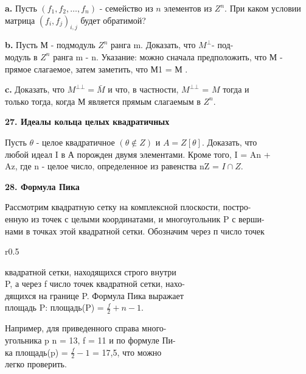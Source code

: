 {\bf a.} Пусть $( f_1,f_2,\ldots,f_n )$ - семейство из $n$ элементов из $Z^n$. При 
каком условии матрица $(f_i,f_j)_{i,j}$ будет обратимой? 

\medskip

{\bf b.} Пусть М - подмодуль $Z^n$ ранга m. Доказать, что $M^{\bot}$- 
под-\\модуль в $Z^n$ ранга m - n. Указание: можно сначала предположить, что 
М - прямое слагаемое, затем заметить, что М1 = М . 

\medskip

{\bf c.} Доказать, что  $M^{\bot\bot} = \bar{M}$ и что, в частности,  $M^{\bot\bot}$ =  $M$ тогда и\\
только тогда, когда М является прямым слагаемым в $Z^n$. 

\medskip

{\noindent\bf27. Идеалы кольца целых квадратичных} 

\medskip

Пусть $\theta$ - целое квадратичное $(\theta\notin Z)$ и $A = Z[\theta] $. Доказать, что\\
любой идеал I в А порожден двумя элементами. Кроме того, I = An +\\ 
Az, где n - целое число, определенное из равенства nZ = $I\cap Z$. 

\medskip

{\noindent\bf28. Формула Пика} 

\medskip

Рассмотрим квадратную сетку на комплексной плоскости, 
постро-\\енную из точек с целыми координатами, и многоугольник P с 
верши-\\нами в точках этой квадратной сетки. Обозначим через п число точек

\pagebreak

\begin{wrapfigure}{r}{0.5\textwidth}
\end{wrapfigure}

квадратной сетки, находящихся строго внутри\\ 
P, а через f число точек квадратной сетки, 
нахо-\\дящихся на границе P. Формула Пика выражает\\ 
площадь P: площадь(P) = $\frac{f}{2} + n - 1$. 

Например, для приведенного справа 
много-\\угольника p n = 13, f = 11 и по формуле 
Пи-\\ка площадь(p) = $\frac{f}{2} - 1$ = 17,5, что можно\\ 
легко проверить. 

